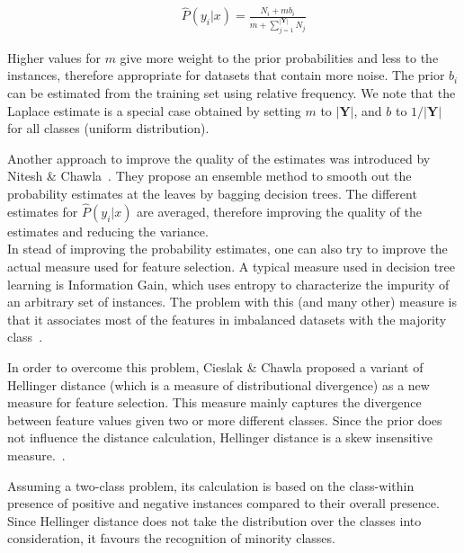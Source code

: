 \begin{eqnarray}
&&\widehat{P}(y_i|x) = \frac{N_{i}+mb_i}{m + \sum_{j=1}^{|\mathbf{Y}|}{N_j}}
\end{eqnarray}

Higher values for \(m\) give more weight to the prior probabilities and less to the instances, therefore appropriate for datasets that contain more noise. The prior \(b_i\) can be estimated from the training set using relative frequency. We note that the Laplace estimate is a special case obtained by setting \(m\) to \(|\mathbf{Y}|\), and \(b\) to \(1/|\mathbf{Y}|\) for all classes (uniform distribution).

Another approach to improve the quality of the estimates was introduced by Nitesh \& Chawla~\cite{probest06}. They propose an ensemble method to smooth out the probability estimates at the leaves by bagging decision trees. The different estimates for $\hat{P}(y_i|x)$ are averaged, therefore improving the quality of the estimates and reducing the variance.\\

In stead of improving the probability estimates, one can also try to improve the actual measure used for feature selection. A typical measure used in decision tree learning is Information Gain, which uses entropy to characterize the impurity of an arbitrary set of instances. The problem with this (and many other) measure is that it associates most of the features in imbalanced datasets with the majority class~\cite{Zheng04featureselection}.

In order to overcome this problem, Cieslak \& Chawla proposed a variant of Hellinger distance (which is a measure of distributional divergence) as a new measure for feature selection. This measure mainly captures the divergence between feature values given two or more different classes. Since the prior does not influence the distance calculation, Hellinger distance is a skew insensitive measure.~\cite{hellinger}. 

Assuming a two-class problem, its calculation is based on the class-within presence of positive and negative instances compared to their overall presence.  Since Hellinger distance does not take the distribution over the classes into consideration, it favours the recognition of minority classes.

